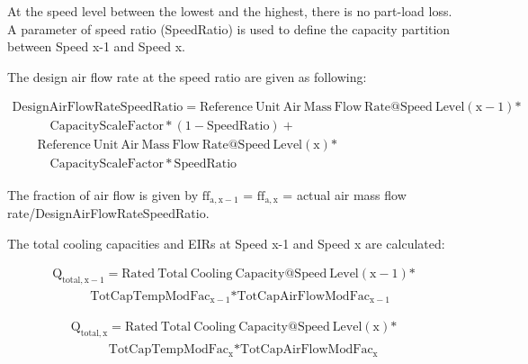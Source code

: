 At the speed level between the lowest and the highest, there is no part-load loss. A parameter of speed ratio (SpeedRatio) is used to define the capacity partition between Speed x-1 and Speed x.

The design air flow rate at the speed ratio are given as following:

\begin{equation}
  \begin{array}{l}
    \mathrm{DesignAirFlowRateSpeedRatio} = \mathrm{Reference~Unit~Air~Mass~Flow~Rate} @ \mathrm{Speed~Level} \left( \mathrm{x} - 1 \right) \mathrm{*} \\
    \quad \quad \quad \mathrm{CapacityScaleFactor*} \left( 1 - \mathrm{SpeedRatio} \right) + \\
    \quad \quad \mathrm{Reference~Unit~Air~Mass~Flow~Rate} @ \mathrm{Speed~Level} \left( \mathrm{x} \right) \mathrm{*} \\
    \quad \quad \quad \mathrm{CapacityScaleFactor*SpeedRatio}
  \end{array}
\end{equation}

The fraction of air flow is given by \({\mathrm{f}}{{\mathrm{f}}_{{\mathrm{a}},{\mathrm{x}} - 1}}\) = \({\mathrm{f}}{{\mathrm{f}}_{{\mathrm{a}},{\mathrm{x}}}}\) = actual air mass flow rate/DesignAirFlowRateSpeedRatio.

The total cooling capacities and EIRs at Speed x-1 and Speed x are calculated:

\begin{equation}
  \begin{array}{l}
    \mathrm{Q}_{\mathrm{total},\mathrm{x} - 1} = \mathrm{Rated~Total~Cooling~Capacity} @ \mathrm{Speed~Level} \left( \mathrm{x} - 1 \right) \mathrm{*} \\
    \quad \quad \quad \mathrm{TotCapTempModFa} \mathrm{c}_{\mathrm{x} - 1} \mathrm{*TotCapAirFlowModFa} \mathrm{c}_{\mathrm{x} - 1}
  \end{array}
\end{equation}

\begin{equation}
  \begin{array}{l}
    \mathrm{Q}_{\mathrm{total},\mathrm{x}} = \mathrm{Rated~Total~Cooling~Capacity} @ \mathrm{Speed~Level} \left( \mathrm{x} \right) \mathrm{*} \\
    \quad \quad \quad \mathrm{TotCapTempModFa} \mathrm{c}_{\mathrm{x}} \mathrm{*TotCapAirFlowModFa} \mathrm{c}_{\mathrm{x}}
  \end{array}
\end{equation}

